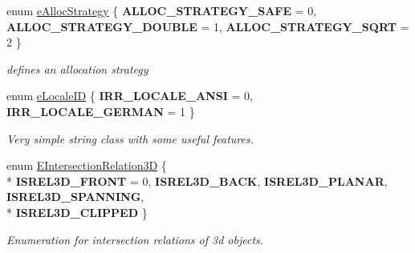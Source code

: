 \begin{DoxyCompactItemize}
\item 
enum \hyperlink{namespaceirr_1_1core_aa2e91971d5e6e84de235bfabe3c7adba}{e\+Alloc\+Strategy} \{ {\bfseries A\+L\+L\+O\+C\+\_\+\+S\+T\+R\+A\+T\+E\+G\+Y\+\_\+\+S\+A\+FE} = 0, 
{\bfseries A\+L\+L\+O\+C\+\_\+\+S\+T\+R\+A\+T\+E\+G\+Y\+\_\+\+D\+O\+U\+B\+LE} = 1, 
{\bfseries A\+L\+L\+O\+C\+\_\+\+S\+T\+R\+A\+T\+E\+G\+Y\+\_\+\+S\+Q\+RT} = 2
 \}\hypertarget{namespaceirr_1_1core_aa2e91971d5e6e84de235bfabe3c7adba}{}\label{namespaceirr_1_1core_aa2e91971d5e6e84de235bfabe3c7adba}
\begin{DoxyCompactList}\small\item\em defines an allocation strategy \end{DoxyCompactList}
\item 
enum \hyperlink{namespaceirr_1_1core_a4682709540c80568b555acc36dbf3a4a}{e\+Locale\+ID} \{ {\bfseries I\+R\+R\+\_\+\+L\+O\+C\+A\+L\+E\+\_\+\+A\+N\+SI} = 0, 
{\bfseries I\+R\+R\+\_\+\+L\+O\+C\+A\+L\+E\+\_\+\+G\+E\+R\+M\+AN} = 1
 \}\begin{DoxyCompactList}\small\item\em Very simple string class with some useful features. \end{DoxyCompactList}
\item 
enum \hyperlink{namespaceirr_1_1core_a8a9999eb0d151083f48afe5f7d17a96c}{E\+Intersection\+Relation3D} \{ \\*
{\bfseries I\+S\+R\+E\+L3\+D\+\_\+\+F\+R\+O\+NT} = 0, 
{\bfseries I\+S\+R\+E\+L3\+D\+\_\+\+B\+A\+CK}, 
{\bfseries I\+S\+R\+E\+L3\+D\+\_\+\+P\+L\+A\+N\+AR}, 
{\bfseries I\+S\+R\+E\+L3\+D\+\_\+\+S\+P\+A\+N\+N\+I\+NG}, 
\\*
{\bfseries I\+S\+R\+E\+L3\+D\+\_\+\+C\+L\+I\+P\+P\+ED}
 \}\hypertarget{namespaceirr_1_1core_a8a9999eb0d151083f48afe5f7d17a96c}{}\label{namespaceirr_1_1core_a8a9999eb0d151083f48afe5f7d17a96c}
\begin{DoxyCompactList}\small\item\em Enumeration for intersection relations of 3d objects. \end{DoxyCompactList}
\end{DoxyCompactItemize}
